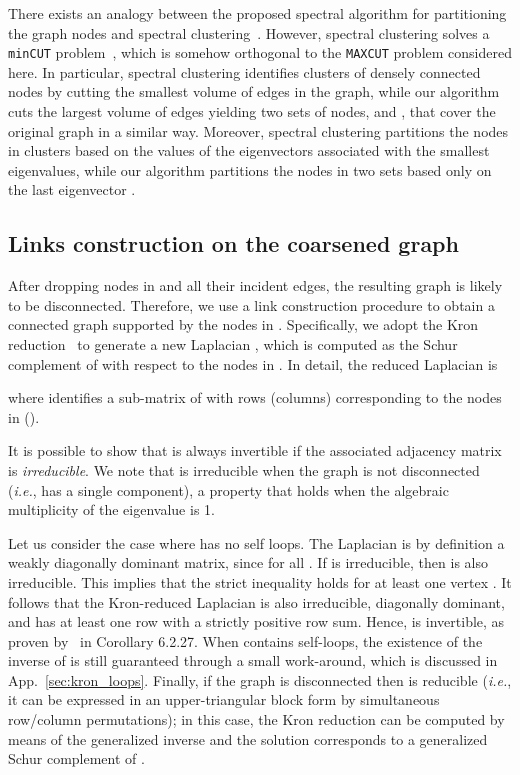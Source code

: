 \documentclass[journal]{IEEEtran}
\newcommand{\maxcut}{\texttt{\small{MAXCUT}}}
\begin{document}
There exists an analogy between the proposed spectral algorithm for partitioning the graph nodes and spectral clustering~\cite{von2007tutorial}.
However, spectral clustering solves a \texttt{\small{minCUT}} problem~\cite{shi2000normalized, icml2020_1614}, which is somehow orthogonal to the \maxcut{} problem considered here.
In particular, spectral clustering identifies  clusters of densely connected nodes by cutting the smallest volume of edges in the graph, while our algorithm cuts the largest volume of edges yielding two sets of nodes,  and , that cover the original graph in a similar way.
Moreover, spectral clustering partitions the nodes in  clusters based on the values of the eigenvectors associated with the  smallest eigenvalues, while our algorithm partitions the nodes in two sets based only on the last eigenvector .

\subsection{Links construction on the coarsened graph}
\label{sec:links_construction}
After dropping nodes in  and all their incident edges, the resulting graph is likely to be disconnected.
Therefore, we use a link construction procedure to obtain a connected graph supported by the nodes in .
Specifically, we adopt the Kron reduction~\cite{kron_red} to generate a new Laplacian , which is computed as the Schur complement of  with respect to the nodes in .
In detail, the reduced Laplacian  is

where  identifies a sub-matrix of  with rows (columns) corresponding to the nodes in  ().

It is possible to show that  is always invertible if the associated adjacency matrix  is \textit{irreducible}.
We note that  is irreducible when the graph is not disconnected (\textit{i.e.}, has a single component), a property that holds when the algebraic multiplicity of the eigenvalue  is 1.

Let us consider the case where  has no self loops.
The Laplacian is by definition a weakly diagonally dominant matrix, since  for all . 
If  is irreducible, then  is also irreducible. 
This implies that the strict inequality  holds for at least one vertex . 
It follows that the Kron-reduced Laplacian  is also irreducible, diagonally dominant, and has at least one row with a strictly positive row sum. Hence,  is invertible, as proven by~\cite{horn2012matrix} in Corollary 6.2.27.
When  contains self-loops, the existence of the inverse of  is still guaranteed through a small work-around, which is discussed in App.~\ref{sec:kron_loops}.
Finally, if the graph is disconnected then  is reducible (\textit{i.e.}, it can be expressed in an upper-triangular block form by simultaneous row/column permutations); in this case, the Kron reduction can be computed by means of the generalized inverse  and the solution corresponds to a generalized Schur complement of .
\end{document}
